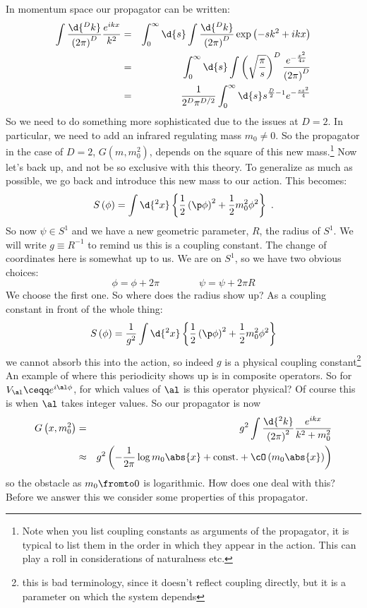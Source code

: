 \documentclass{booc}
\begin{document}
In momentum space our propagator can be written:
\begin{eqnarray}
\int 
\frac{\d{^D k}}{\left( 2\pi \right)^D}
\frac{e^{ikx}}{k^2}
&=&  
\int_0^\infty \d{s}
\int \frac{\d{^D k}}{\left( 2\pi \right)^D}
\exp\left( 
-sk^2 + ikx
\right)
\\&=& 
\int_0^\infty \d{s}
\int 
\left( 
\sqrt{\frac{\pi}{s}}
\right)^D
\frac{e^{-\frac{x^2}{4s}}}{\left( 2\pi \right)^D}
\\&=& 
\frac{1}{2^D\pi^{D /2}}
\int_0^\infty
\d{s} s^{\frac{D}{2} - 1}
e^{-\frac{sx^2}{4}}
\end{eqnarray}
So we need to do something more sophisticated due to the issues at $D = 2$. 
In particular, we need to add an infrared regulating mass $m_0 \neq 0$.
So the propagator in the case of $D = 2$,
$G\left( m , m_0^2 \right)$, depends on the square of this new mass.\footnote{
Note when you list coupling constants as arguments of the propagator, 
it is typical to list them
in the order in which they appear in the action.
This can play a roll in considerations of naturalness etc.}
Now let's back up, and not be so exclusive with this theory. 
To generalize as much as possible, we go back and introduce this new mass to our action. 
This becomes:
\begin{equation}
S\left( \phi \right) = 
\int \d{^2 x}
\left\{ \frac{1}{2}\left( \p \phi \right)^2
+ \frac{1}{2}m_0^2 \phi^2\right\}
\ .
\end{equation}
So now $\psi \in S^1$
and we have a new geometric parameter, $R$,
the radius of $S^1$.
We will write $g\equiv R^{-1}$ to remind us this is a coupling constant.
The change of coordinates here is somewhat up to us. 
We are on $S^1$, 
so we have two obvious choices:
\begin{equation}
\phi = \phi + 2\pi
\qquad\qquad
\psi = \psi + 2\pi R
\end{equation}
We choose the first one.
So where does the radius show up?
As a coupling constant in front of the whole thing:
\begin{equation}
S\left( \phi \right) = 
\frac{1}{g^2}
\int \d{^2 x}
\left\{ \frac{1}{2}\left( \p \phi \right)^2
+ \frac{1}{2}m_0^2 \phi^2\right\}
\end{equation}
we cannot absorb this into the action, so indeed $g$
is a physical coupling constant\footnote{
this is bad terminology, since it doesn't reflect
coupling directly, but it is a parameter on which the system depends} 
An example of where this periodicity shows up is in
composite operators. 
So for $V_\al \ceqq e^{i\al \phi}$, for which values of $\al$
is this operator physical?
Of course this is when $\al$ takes integer values.
So our propagator is now
\begin{eqnarray}
G\left( x , m_0^2 \right) &=&  
g^2 \int
\frac{\d{^2k}}{\left( 2\pi \right)^2}
\frac{e^{ikx}}{k^2 + m_0^2}
\\
&\approx & g^2 \left( -\frac{1}{2\pi}
\log m_0 \abs{x} + \text{const.}
+ \cO\left( m_0 \abs{x} \right)
\right)
\label{eqn:free_scalar_propagator}
\end{eqnarray}
so the obstacle as $m_0 \fromto 0$ is logarithmic.
How does one deal with this?
Before we answer this we consider some properties of this propagator.
\end{document}
